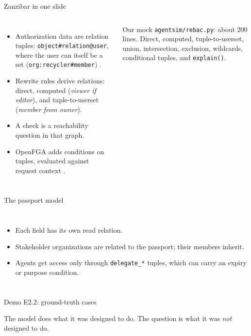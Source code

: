 \documentclass[aspectratio=169, 10pt]{beamer}
\begin{document}
\begin{frame}{Zanzibar in one slide}
  \begin{columns}[T]
    \begin{itemize}\small
      \item Authorization data are relation tuples: \texttt{object\#relation@user}, where the user can itself be a set (\texttt{org:recycler\#member}) .
      \item Rewrite rules derive relations: direct, computed (\emph{viewer if editor}), and tuple-to-userset (\emph{member from owner}).
      \item A check is a reachability question in that graph.
      \item OpenFGA adds conditions on tuples, evaluated against request context .
    \end{itemize}
    \begin{block}{Our mock}\small
      \texttt{agentsim/rebac.py}: about 200 lines. Direct, computed, tuple-to-userset, union, intersection, exclusion, wildcards, conditional tuples, and \texttt{explain()}.
    \end{block}
  \end{columns}
\end{frame}

\begin{frame}{The passport model}
  \begin{columns}[T]
    \small
    \begin{itemize}
      \item Each field has its own read relation.
      \item Stakeholder organizations are related to the passport; their members inherit.
      \item Agents get access only through \texttt{delegate\_*} tuples, which can carry an expiry or purpose condition.
    \end{itemize}
  \end{columns}
\end{frame}

\begin{frame}{Demo E2.2: ground-truth cases}
  \centering{}\par
  \vspace{2mm}
  {\small The model does what it was designed to do. The question is what it was \emph{not} designed to do.}
\end{frame}
\end{document}
